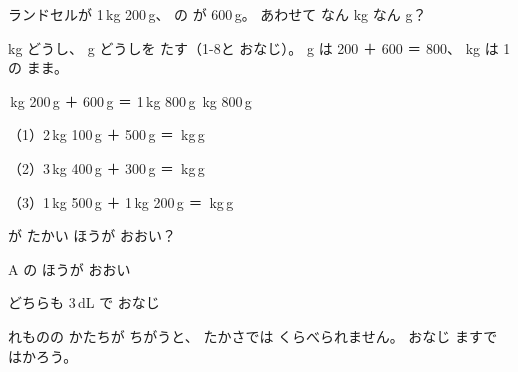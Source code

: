 \begin{reidai}[おもさの たし\R{算}{ざん}]
ランドセルが 1\,kg 200\,g、 の が 600\,g。 あわせて なん kg なん g？

\begin{bkfigure}
\end{bkfigure}
\kangaekata kg どうし、 g どうしを たす（1-8と おなじ）。 g は 200 ＋ 600 ＝ 800、 kg は 1の まま。

\,kg 200\,g ＋ 600\,g ＝ 1\,kg 800\,g \,kg 800\,g
\end{reidai}

\begin{jibun}
\noindent（1）2\,kg 100\,g ＋ 500\,g ＝ \bkkakikomi\,kg\enspace\bkkakikomi[14mm]\,g\par\vspace{3pt}
\noindent（2）3\,kg 400\,g ＋ 300\,g ＝ \bkkakikomi\,kg\enspace\bkkakikomi[14mm]\,g\par\vspace{3pt}
\noindent（3）1\,kg 500\,g ＋ 1\,kg 200\,g ＝ \bkkakikomi\,kg\enspace\bkkakikomi[14mm]\,g
\end{jibun}


\clearpage

\begin{tsumazuki}{が たかい ほうが おおい？}
\noindent\begin{minipage}[c]{0.36\linewidth}\centering
{}
\end{minipage}\hfill
\begin{minipage}[c]{0.62\linewidth}
\bkbatsu\enspace A の ほうが おおい\par
\bkmaru\enspace どちらも 3\,dL で おなじ\par
{}れものの かたちが ちがうと、 たかさでは くらべられません。 おなじ ますで はかろう。
\end{minipage}
\end{tsumazuki}

